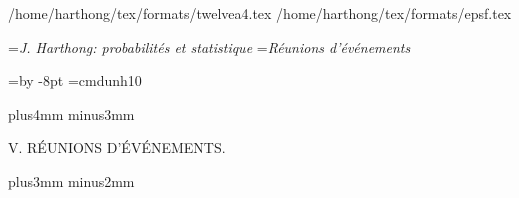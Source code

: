 /home/harthong/tex/formats/twelvea4.tex
/home/harthong/tex/formats/epsf.tex

\auteurcourant={\sl J. Harthong: probabilit\'es et statistique}
\titrecourant={\sl R\'eunions d'\'ev\'enements}


\newdimen\blocksize  \blocksize=\vsize \advance\blocksize by -8pt
\font\gtm=cmdunh10
\def\struta{\vrule depth1.8pt width0pt}
\def\strutb{\vrule height7.5pt width0pt}
\def\ata{\hskip-2.5pt}
\def\aub{\hskip1pt}
\def\rom{\hbox{\gtm R}}
\def\qom{\hbox{\gtm Q}}
\def\som{\hbox{\gtm S}}
\def\bgl{\raise1.3pt\hbox{$($}}
\def\bgr{\raise1.3pt\hbox{$)$}}

\null\vskip10mm plus4mm minus3mm

\centerline{\tit V\ata .  R\'EUNIONS D'\'EV\'ENEMENTS.}

\vskip10mm plus3mm minus2mm

